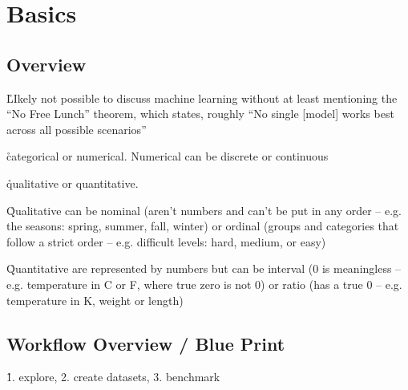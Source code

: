\chapter{Basics}

\section{Overview}

\r{LIkely not possible to discuss machine learning without at least mentioning the ``No Free Lunch'' theorem, which states, roughly ``No single [model] works best across all possible scenarios''~\cite{wolpert1997no}}


\r{categorical or numerical. Numerical can be discrete or continuous}

\r{qualitative or quantitative.} 

\r{Qualitative can be nominal (aren't numbers and can't be put in any order -- e.g. the seasons: spring, summer, fall, winter) or ordinal (groups and categories that follow a strict order -- e.g. difficult levels: hard, medium, or easy)}

\r{Quantitative are represented by numbers but can be interval (0 is meaningless -- e.g. temperature in C or F, where true zero is not 0) or ratio (has a true 0 -- e.g. temperature in K, weight or length)}

\section{Workflow Overview / Blue Print}


\r{1. explore, 2. create datasets, 3. benchmark}

